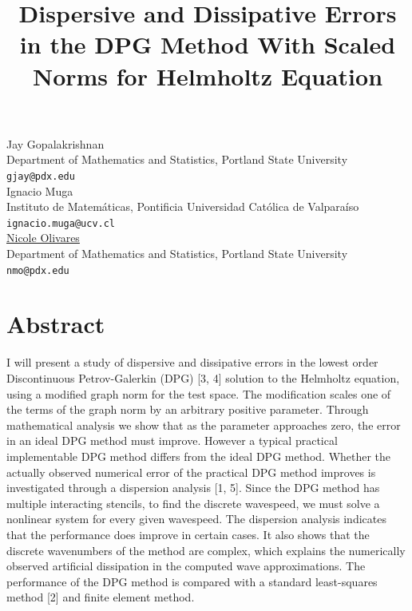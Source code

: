 \documentclass[article,A4,11pt]{llncs}%
\begin{document}
\title{Dispersive and Dissipative Errors in the DPG Method With Scaled Norms for Helmholtz Equation}
 \author{} \institute{}
\maketitle
\begin{center}
{\large Jay Gopalakrishnan}\\
Department of Mathematics and Statistics, Portland State University\\
{\tt gjay@pdx.edu}
\\ \vspace{4mm}
{\large Ignacio Muga}\\
Instituto de Matemáticas, Pontificia Universidad Católica de Valparaíso\\
{\tt ignacio.muga@ucv.cl}
\\ \vspace{4mm}
{\large \underline{Nicole Olivares}}\\
Department of Mathematics and Statistics, Portland State University\\
{\tt nmo@pdx.edu}
\end{center}

\section*{Abstract}
I will present a study of dispersive and dissipative errors in the lowest order Discontinuous Petrov-Galerkin (DPG) [3, 4] solution to the Helmholtz equation, using a modified graph norm for the test space. The modification scales one of the terms of the graph norm by an arbitrary positive parameter. Through mathematical analysis we show that as the parameter approaches zero, the error in an ideal DPG method must improve. However a typical practical implementable DPG method differs from the ideal DPG method. Whether the actually observed numerical error of the practical DPG method improves is investigated through a dispersion analysis [1, 5]. Since the DPG method has multiple interacting stencils, to find the discrete wavespeed, we must solve a nonlinear system for every given wavespeed. The dispersion analysis indicates that the performance does improve in certain cases. It also shows that the discrete wavenumbers of the method are complex, which explains the numerically observed artificial dissipation in the computed wave approximations. The performance of the DPG method is compared with a standard least-squares method [2] and finite element method.
\end{document}
